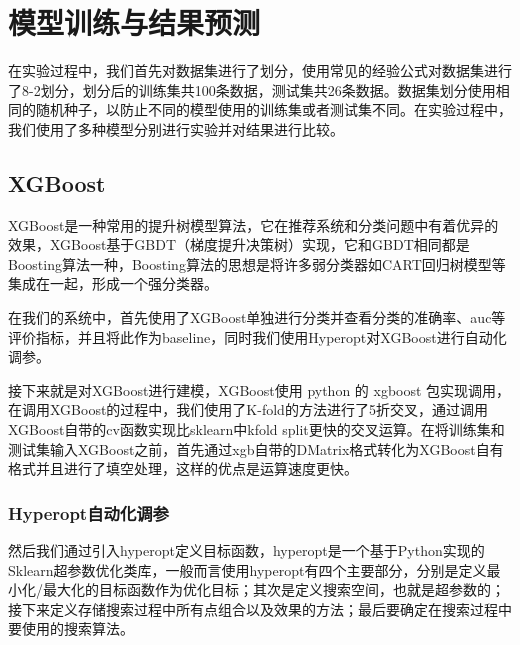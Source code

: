 %
%
%
%
%
%

\chapter{模型训练与结果预测}

在实验过程中，我们首先对数据集进行了划分，使用常见的经验公式对数据集进行了8-2划分，划分后的训练集共100条数据，测试集共26条数据。数据集划分使用相同的随机种子，以防止不同的模型使用的训练集或者测试集不同。在实验过程中，我们使用了多种模型分别进行实验并对结果进行比较。

\section{XGBoost}

XGBoost是一种常用的提升树模型算法，它在推荐系统和分类问题中有着优异的效果，XGBoost基于GBDT（梯度提升决策树）实现，它和GBDT相同都是Boosting算法一种，Boosting算法的思想是将许多弱分类器如CART回归树模型等集成在一起，形成一个强分类器。

在我们的系统中，首先使用了XGBoost单独进行分类并查看分类的准确率、auc等评价指标，并且将此作为baseline，同时我们使用Hyperopt对XGBoost进行自动化调参。

接下来就是对XGBoost进行建模，XGBoost使用 python 的 xgboost 包实现调用，在调用XGBoost的过程中，我们使用了K-fold的方法进行了5折交叉，通过调用XGBoost自带的cv函数实现比sklearn中kfold split更快的交叉运算。在将训练集和测试集输入XGBoost之前，首先通过xgb自带的DMatrix格式转化为XGBoost自有格式并且进行了填空处理，这样的优点是运算速度更快。

\subsection{Hyperopt自动化调参}

然后我们通过引入hyperopt定义目标函数，hyperopt是一个基于Python实现的Sklearn超参数优化类库，一般而言使用hyperopt有四个主要部分，分别是定义最小化/最大化的目标函数作为优化目标；其次是定义搜索空间，也就是超参数的；接下来定义存储搜索过程中所有点组合以及效果的方法；最后要确定在搜索过程中要使用的搜索算法。

